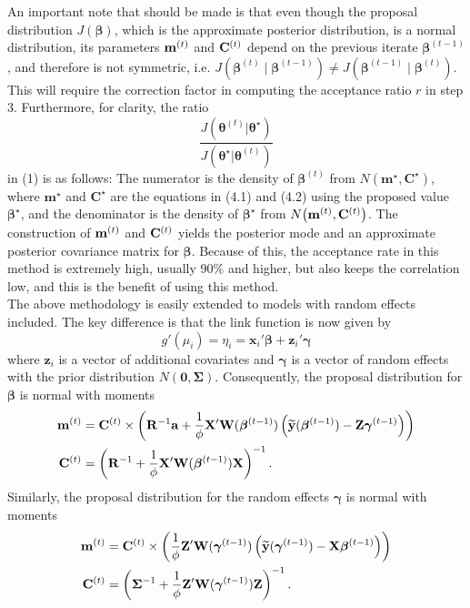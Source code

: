 \documentclass[12pt]{extarticle}
\begin{document}
An important note that should be made is that even though the proposal distribution $J(\boldsymbol\beta)$, which is the approximate posterior distribution, is a normal distribution, its parameters ${\bf m}^{(t)}$ and ${\bf C}^{(t)}$ depend on the previous iterate $\boldsymbol\beta^{(t-1)}$, and therefore is not symmetric, i.e. $J(\boldsymbol\beta^{(t)}\mid \boldsymbol\beta^{(t-1)}) \not= J(\boldsymbol\beta^{(t-1)}\mid \boldsymbol\beta^{(t)})$.  This will require the correction factor in computing the acceptance ratio $r$ in step 3.  Furthermore, for clarity, the ratio
\[
\frac{J(\boldsymbol\theta^{(t)}|\boldsymbol\theta^\star)}{J(\boldsymbol\theta^\star|\boldsymbol\theta^{(t)})}
\]
in (1) is as follows:  The numerator is the density of $\bm\beta^{(t)}$ from $N(\mathbf{m}^\star,\mathbf{C}^\star)$, where $\mathbf{m}^\star$ and $\mathbf{C}^\star$ are the equations in (4.1) and (4.2) using the proposed value $\bm\beta^\star$, and the denominator is the density of $\bm\beta^\star$ from $N\big{(}\mathbf{m}^{(t)},\mathbf{C}^{(t)}\big{)}$.
 The construction of ${\bf m}^{(t)}$ and ${\bf C}^{(t)}$ yields the posterior mode and an approximate posterior covariance matrix for $\boldsymbol\beta$.  Because of this, the acceptance rate in this method is extremely high, usually 90$\%$ and higher, but also keeps the correlation low, and this is the benefit of using this method. \\
\noindent\indent The above methodology is easily extended to models with random effects included.  The key difference is that the link function is now given by
\[
g'(\mu_i) = \eta_i = \mathbf{x}_i'\bm\beta + \mathbf{z}_i'\bm\gamma
\]
where $\mathbf{z}_i$ is a vector of additional covariates and $\bm\gamma$ is a vector of random effects with the prior distribution $N(\mathbf{0},\bm\Sigma)$.  Consequently, the proposal distribution for $\bm\beta$ is normal with moments
\begin{align*}
{\bf m}^{(t)} &= {\bf C}^{(t)}\times\left({\bf R}^{-1}{\bf a} + \frac{1}{\phi}{\bf X}'{\bf W}(\boldsymbol\beta^{(t-1)})\left(\widetilde{{\bf y}}(\boldsymbol\beta^{(t-1)}) - \mathbf{Z}\bm\gamma^{(t-1)}\right)\right) \\
{\bf C}^{(t)} &= \left({\bf R}^{-1} + \frac{1}{\phi}{\bf X}'{\bf W}(\boldsymbol\beta^{(t-1)}){\bf X}\right)^{-1}.
\end{align*}
Similarly, the proposal distribution for the random effects $\bm\gamma$ is normal with moments
\begin{align*}
{\bf m}^{(t)} &= {\bf C}^{(t)}\times\left(\frac{1}{\phi}{\bf Z}'{\bf W}(\boldsymbol\gamma^{(t-1)})\left(\widetilde{{\bf y}}(\boldsymbol\gamma^{(t-1)}) - \mathbf{X}\bm\beta^{(t-1)}\right)\right) \\
{\bf C}^{(t)} &= \left(\bm\Sigma^{-1} + \frac{1}{\phi}{\bf Z}'{\bf W}(\boldsymbol\gamma^{(t-1)}){\bf Z}\right)^{-1}.
\end{align*}
\end{document}
